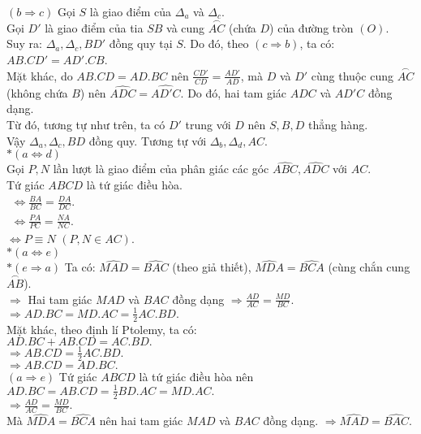 \documentclass[12pt,a4paper]{article}
\begin{document}
\(\left( {b \Rightarrow c} \right)\) Gọi \(S\) là giao điểm của \({\Delta _a}\) và \({\Delta _c}.\)\\
Gọi \(D'\) là giao điểm của tia \(SB\) và cung $\stackrel\frown{AC}$ (chứa \(D\)) của đường tròn \(\left( O \right)\).\\
Suy ra: \({\Delta _a},{\Delta _c},BD'\) đồng quy tại \(S\). Do đó, theo \(\left( {c \Rightarrow b} \right)\), ta có: \(AB.CD' = AD'.CB\).\\
Mặt khác, do \(AB.CD = AD.BC\) nên \(\frac{{CD'}}{{CD}} = \frac{{AD'}}{{AD}}\), mà \(D\) và \(D'\) cùng thuộc cung $\stackrel\frown{AC}$ (không chứa \(B\)) nên \(\widehat {ADC} = \widehat {AD'C}.\) Do đó, hai tam giác \({ADC}\) và \({AD'C}\) đồng dạng.\\
Từ đó, tương tự như trên, ta có \(D'\) trung với \(D\) nên \(S, B, D\) thẳng hàng.\\
Vậy \({\Delta _a}, {\Delta_c}, BD\) đồng quy. Tương tự với \({\Delta_b}, {\Delta_d}, AC\).\\
\(*\left( {a \Leftrightarrow d} \right)\)\\
Gọi \(P, N\) lần lượt là giao điểm của phân giác các góc \(\widehat {ABC},\widehat {ADC}\) với \(AC\).\\
Tứ giác \(ABCD\) là tứ giác điều hòa.\\
\(\begin{array}{l}
 \Leftrightarrow \frac{{BA}}{{BC}} = \frac{{DA}}{{DC}}.\\
 \Leftrightarrow \frac{{PA}}{{PC}} = \frac{{NA}}{{NC}}.
\end{array}\)\\
\( \Leftrightarrow P \equiv N\) \(\left( {P,N \in AC} \right).\)\\
\(*\left( {a \Leftrightarrow e} \right)\)\\
\(*\left( {e \Rightarrow a} \right)\) Ta có: \(\widehat {MAD} = \widehat {BAC}\) (theo giả thiết), \(\widehat {MDA} = \widehat {BCA}\) (cùng chắn cung $\stackrel\frown{AB}$).\\
\( \Rightarrow \) Hai tam giác \(MAD\) và \(BAC\) đồng dạng \( \Rightarrow \frac{{AD}}{{AC}} = \frac{{MD}}{{BC}}.\)\\
\( \Rightarrow AD.BC = MD.AC = \frac{1}{2}AC.BD.\)\\
Mặt khác, theo định lí Ptolemy, ta có:\\
\(AD.BC + AB.CD = AC.BD.\)\\
\( \Rightarrow AB.CD = \frac{1}{2}AC.BD.\)\\
\( \Rightarrow AB.CD = AD.BC.\)\\
\(\left( {a \Rightarrow e} \right)\) Tứ giác \(ABCD\) là tứ giác điều hòa nên \(AD.BC = AB.CD = \frac{1}{2}BD.AC = MD.AC.\)\\
\( \Rightarrow \frac{{AD}}{{AC}} = \frac{{MD}}{{BC}}.\)\\
Mà \(\widehat {MDA} = \widehat {BCA}\) nên hai tam giác \(MAD\) và \(BAC\) đồng dạng.
\( \Rightarrow \widehat {MAD} = \widehat {BAC}.\)\\
\end{document}

